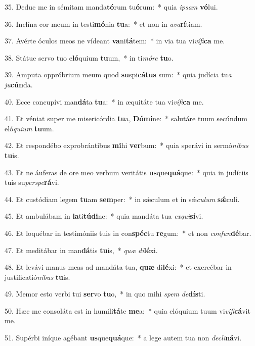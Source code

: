 35. Deduc me in sémitam manda\textbf{tó}rum tu\textbf{ó}rum:~*  quia \textit{ip}\textit{sam} \textbf{vó}lui.\

36. Inclína cor meum in testi\textbf{mó}nia \textbf{tu}a:~*  et non in \textit{a}\textit{va}\textbf{rí}tiam.\

37. Avérte óculos meos ne vídeant \textbf{va}ni\textbf{tá}tem:~*  in via tua vi\textit{ví}\textit{fi}\textbf{ca} me.\

38. Státue servo tuo e\textbf{ló}quium \textbf{tu}um,~*  in ti\textit{mó}\textit{re} \textbf{tu}o.\

39. Amputa oppróbrium meum quod \textbf{su}spi\textbf{cá}\textbf{tus} sum:~*  quia judícia tu\textit{a} \textit{ju}\textbf{cún}da.\

40. Ecce concupívi man\textbf{dá}ta \textbf{tu}a:~*  in æquitáte tua vi\textit{ví}\textit{fi}\textbf{ca} me.\

41. Et véniat super me misericórdia \textbf{tu}a, \textbf{Dó}\textbf{mi}ne:~*  salutáre tuum secúndum eló\textit{qui}\textit{um} \textbf{tu}um.\

42. Et respondébo exprobrántibus \textbf{mi}hi \textbf{ver}bum:~*  quia sperávi in sermó\textit{ni}\textit{bus} \textbf{tu}is.\

43. Et ne áuferas de ore meo verbum veritátis \textbf{us}que\textbf{quá}que:~*  quia in judíciis tuis su\textit{per}\textit{spe}\textbf{rá}vi.\

44. Et custódiam legem \textbf{tu}am \textbf{sem}per:~*  in sǽculum et in sǽ\textit{cu}\textit{lum} \textbf{sǽ}culi.\

45. Et ambulábam in \textbf{la}ti\textbf{tú}\textbf{di}ne:~*  quia mandáta tua \textit{ex}\textit{qui}\textbf{sí}vi.\

46. Et loquébar in testimóniis tuis in con\textbf{spéc}tu \textbf{re}gum:~*  et non \textit{con}\textit{fun}\textbf{dé}bar.\

47. Et meditábar in man\textbf{dá}tis \textbf{tu}is,~*  \textit{quæ} \textit{di}\textbf{lé}xi.\

48. Et levávi manus meas ad mandáta tua, \textbf{quæ} di\textbf{lé}xi:~*  et exercébar in justificatió\textit{ni}\textit{bus} \textbf{tu}is.\

49. Memor esto verbi tui \textbf{ser}vo \textbf{tu}o,~*  in quo mihi \textit{spem} \textit{de}\textbf{dís}ti.\

50. Hæc me consoláta est in humili\textbf{tá}te \textbf{me}a:~*  quia elóquium tuum vi\textit{vi}\textit{fi}\textbf{cá}vit me.\

51. Supérbi iníque agébant \textbf{us}que\textbf{quá}que:~*  a lege autem tua non \textit{de}\textit{cli}\textbf{ná}vi.\

